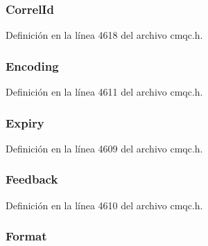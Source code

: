\subsubsection[{Correl\+Id}]{ Correl\+Id}\label{structtag_m_q_m_d2_acac8d73138c2c618b41a274eb92e5f2a}


Definición en la línea 4618 del archivo cmqc.\+h.

\hypertarget{structtag_m_q_m_d2_a30167bf454a49a60fd3fe4e9e586af34}{}
\subsubsection[{Encoding}]{ Encoding}\label{structtag_m_q_m_d2_a30167bf454a49a60fd3fe4e9e586af34}


Definición en la línea 4611 del archivo cmqc.\+h.

\hypertarget{structtag_m_q_m_d2_a85cb54f2f2a97fe071fcad54d22a92a9}{}
\subsubsection[{Expiry}]{ Expiry}\label{structtag_m_q_m_d2_a85cb54f2f2a97fe071fcad54d22a92a9}


Definición en la línea 4609 del archivo cmqc.\+h.

\hypertarget{structtag_m_q_m_d2_a9cb2f407eb097aa9cdc246dc18059987}{}
\subsubsection[{Feedback}]{ Feedback}\label{structtag_m_q_m_d2_a9cb2f407eb097aa9cdc246dc18059987}


Definición en la línea 4610 del archivo cmqc.\+h.

\hypertarget{structtag_m_q_m_d2_a435a478822008713f8aaff89f369ed63}{}
\subsubsection[{Format}]{ Format}\label{structtag_m_q_m_d2_a435a478822008713f8aaff89f369ed63}


